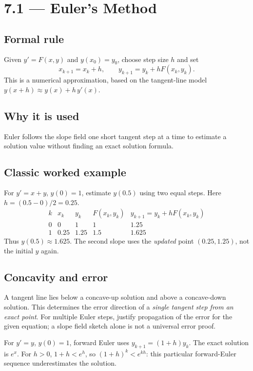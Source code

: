 \documentclass[11pt]{article}
\newcommand{\topic}[2]{\clearpage\section*{#1 --- #2}}
\begin{document}
\topic{7.1}{Euler's Method}
\subsection*{Formal rule}
Given $y'=F(x,y)$ and $y(x_0)=y_0$, choose step size $h$ and set
\[
\boxed{x_{k+1}=x_k+h,\qquad y_{k+1}=y_k+hF(x_k,y_k).}
\]
This is a numerical approximation, based on the tangent-line model
$y(x+h)\approx y(x)+h\,y'(x)$.

\subsection*{Why it is used}
Euler follows the slope field one short tangent step at a time to estimate a solution value without finding an exact solution formula.

\subsection*{Classic worked example}
For $y'=x+y$, $y(0)=1$, estimate $y(0.5)$ using two equal steps. Here $h=(0.5-0)/2=0.25$.
\[
\begin{array}{c|c|c|c|c}
k&x_k&y_k&F(x_k,y_k)&y_{k+1}=y_k+hF(x_k,y_k)\\\hline
0&0&1&1&1.25\\
1&0.25&1.25&1.5&1.625
\end{array}
\]
Thus $y(0.5)\approx1.625$. The second slope uses the \emph{updated} point $(0.25,1.25)$, not the initial $y$ again.

\subsection*{Concavity and error}
A tangent line lies below a concave-up solution and above a concave-down solution. This determines the error direction of a \emph{single tangent step from an exact point}. For multiple Euler steps, justify propagation of the error for the given equation; a slope field sketch alone is not a universal error proof.

For $y'=y$, $y(0)=1$, forward Euler uses $y_{k+1}=(1+h)y_k$.
The exact solution is $e^x$. For $h>0$, $1+h<e^h$, so $(1+h)^k<e^{kh}$: this particular forward-Euler sequence underestimates the solution.
\end{document}
